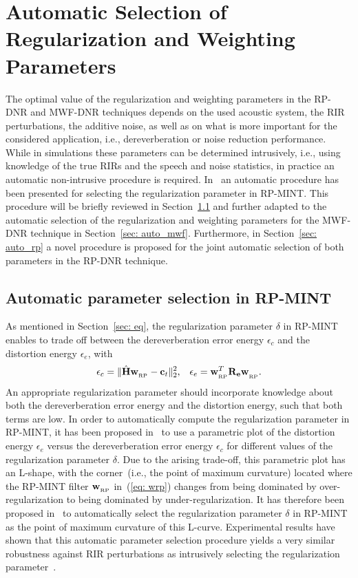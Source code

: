 \documentclass[draftcls,onecolumn,11pt]{IEEEtran}
\begin{document}
\section{Automatic Selection of Regularization and Weighting Parameters}
\label{sec: auto}
The optimal value of the regularization and weighting parameters in the RP-DNR and MWF-DNR techniques depends on the used acoustic system, the RIR perturbations, the additive noise, as well as on what is more important for the considered application, i.e., dereverberation or noise reduction performance.
While in simulations these parameters can be determined intrusively, i.e., using knowledge of the true RIRs and the speech and noise statistics, in practice an automatic non-intrusive procedure is required.
In~\cite{Kodrasi_ITASLP_2013} an automatic procedure has been presented for selecting the regularization parameter in RP-MINT.
This procedure will be briefly reviewed in Section~\ref{sec: auto_rpmint} and further adapted to the automatic selection of the regularization and weighting parameters for the MWF-DNR technique in Section~\ref{sec: auto_mwf}.
Furthermore, in Section~\ref{sec: auto_rp} a novel procedure is proposed for the joint automatic selection of both parameters in the RP-DNR technique.

\subsection{Automatic parameter selection in RP-MINT}
\label{sec: auto_rpmint}
As mentioned in Section~\ref{sec: eq}, the regularization parameter $\delta$ in RP-MINT enables to trade off between the dereverberation error energy $\epsilon_c$ and the distortion energy $\epsilon_e$, with
\begin{equation}
\epsilon_c  = \|\hat{\mathbf{H}}\mathbf{w}_{_{\rm RP}} -\mathbf{c}_t \|_2^2, \; \; \; \epsilon_e = \mathbf{w}_{_{\rm RP}}^T\mathbf{R}_{\mathbf{e}}\mathbf{w}_{_{\rm RP}}^{}.
\end{equation}
An appropriate regularization parameter should incorporate knowledge about both the dereverberation error energy and the distortion energy, such that both terms are low.
In order to automatically compute the regularization parameter in RP-MINT, it has been proposed in~\cite{Kodrasi_ITASLP_2013} to use a parametric plot of the distortion energy $\epsilon_e$ versus the dereverberation error energy $\epsilon_c$ for different values of the regularization parameter $\delta$.
Due to the arising trade-off, this parametric plot has an L-shape, with the corner~(i.e., the point of maximum curvature) located where the RP-MINT filter $\mathbf{w}_{_{\rm RP}}$ in~(\ref{eq: wrp}) changes from being dominated by over-regularization to being dominated by under-regularization.
It has therefore been proposed in~\cite{Kodrasi_ITASLP_2013} to automatically select the regularization parameter $\delta$ in RP-MINT as the point of maximum curvature of this L-curve.
Experimental results have shown that this automatic parameter selection procedure yields a very similar robustness against RIR perturbations as intrusively selecting the regularization parameter~\cite{Kodrasi_ITASLP_2013}. 
\end{document}
